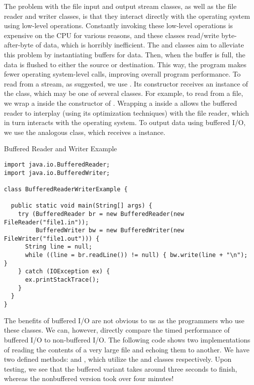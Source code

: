 The problem with the file input and output stream classes, as well as the file reader and writer classes, is that they interact directly with the operating system using low-level operations. Constantly invoking these low-level operations is expensive on the CPU for various reasons, and these classes read/write byte-after-byte of data, which is horribly inefficient. The  and  classes aim to alleviate this problem by instantiating buffers for data. Then, when the buffer is full, the data is flushed to either the source or destination. This way, the program makes fewer operating system-level calls, improving overall program performance. To read from a stream, as suggested, we use . Its constructor receives an instance of the  class, which may be one of several classes. For example, to read from a file, we wrap a  inside the constructor of . Wrapping a  inside a  allows the buffered reader to interplay (using its optimization techniques) with the file reader, which in turn interacts with the operating system. To output data using buffered I/O, we use the analogous  class, which receives a  instance. 


\begin{cl}{Buffered Reader and Writer Example}
\begin{lstlisting}[language=MyJava]
import java.io.BufferedReader;
import java.io.BufferedWriter;

class BufferedReaderWriterExample {

  public static void main(String[] args) {
    try (BufferedReader br = new BufferedReader(new FileReader("file1.in"));
         BufferedWriter bw = new BufferedWriter(new FileWriter("file1.out"))) {
      String line = null;
      while ((line = br.readLine()) != null) { bw.write(line + "\n"); }
    } catch (IOException ex) {
      ex.printStackTrace();
    }
  }
}
\end{lstlisting}
\end{cl}

The benefits of buffered I/O are not obvious to us as the programmers who use these classes. We can, however, directly compare the timed performance of buffered I/O to non-buffered I/O. The following code shows two implementations of reading the contents of a very large file and echoing them to another. We have two defined methods:  and , which utilize the  and  classes respectively. Upon testing, we see that the buffered variant takes around three seconds to finish, whereas the nonbuffered version took over four minutes!

